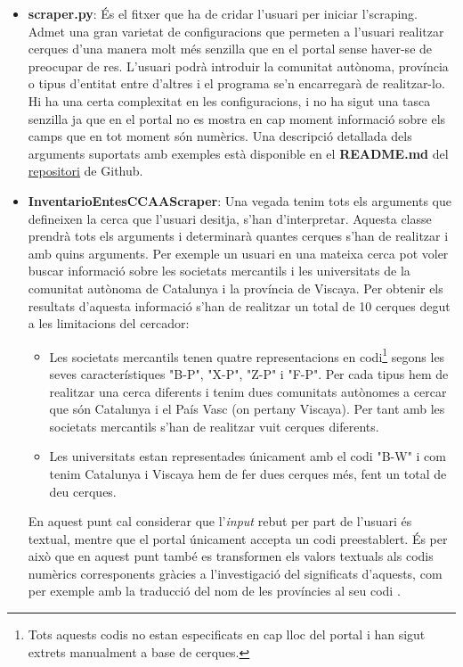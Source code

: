 \documentclass[12pt]{article}
\begin{document}
\begin{itemize}
    \item \textbf{scraper.py}: És el fitxer que ha de cridar l'usuari per iniciar l'scraping. Admet una gran varietat de configuracions que permeten a l'usuari realitzar cerques d'una manera molt més senzilla que en el portal sense haver-se de preocupar de res. L'usuari podrà introduir la comunitat autònoma, província o tipus d'entitat entre d'altres i el programa se'n encarregarà de realitzar-lo. Hi ha una certa complexitat en les configuracions, i no ha sigut una tasca senzilla ja que en el portal no es mostra en cap moment informació sobre els camps que en tot moment són numèrics. Una descripció detallada dels arguments suportats amb exemples està disponible en el \textbf{README.md} del \href{https://github.com/boschmateo/InventarioEntesCCAA}{repositori} de Github.
    \item \textbf{InventarioEntesCCAAScraper}: Una vegada tenim tots els arguments que defineixen la cerca que l'usuari desitja, s'han d'interpretar. Aquesta classe prendrà tots els arguments i determinarà quantes cerques s'han de realitzar i amb quins arguments. Per exemple un usuari en una mateixa cerca pot voler buscar informació sobre les societats mercantils i les universitats de la comunitat autònoma de Catalunya i la província de Viscaya. Per obtenir els resultats d'aquesta informació s'han de realitzar un total de 10 cerques degut a les limitacions del cercador:
    \begin{itemize}
        \item Les societats mercantils tenen quatre representacions en codi\footnote{Tots aquests codis no estan especificats en cap lloc del portal i han sigut extrets manualment a base de cerques.} segons les seves característiques "B-P", "X-P", "Z-P" i "F-P". Per cada tipus hem de realitzar una cerca diferents i tenim dues comunitats autònomes a cercar que són Catalunya i el País Vasc (on pertany Viscaya). Per tant amb les societats mercantils s'han de realitzar vuit cerques diferents.
        \item Les universitats estan representades únicament amb el codi "B-W" i com tenim Catalunya i Viscaya hem de fer dues cerques més, fent un total de deu cerques.
    \end{itemize}
    En aquest punt cal considerar que l'\textit{input} rebut per part de l'usuari és textual, mentre que el portal únicament accepta un codi preestablert. És per això que en aquest punt també es transformen els valors textuals als codis numèrics corresponents gràcies a l'investigació del significats d'aquests, com per exemple amb la traducció del nom de les províncies al seu codi \cite{INE}.

\end{itemize}
\end{document}
